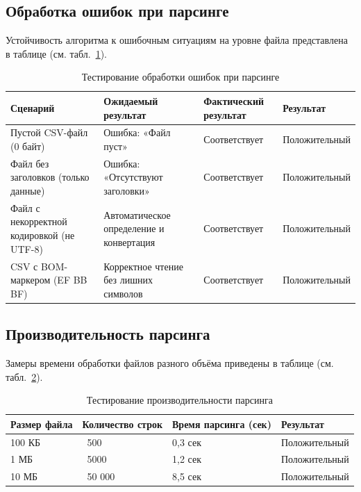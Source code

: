 \subsection{Обработка ошибок при парсинге}
Устойчивость алгоритма к ошибочным ситуациям на уровне файла представлена в таблице (см. табл.~\ref{tab:testParseError}).

\begin{table}[H]
\caption{\label{tab:testParseError}Тестирование обработки ошибок при парсинге}
\small
\begin{center}
\vspace{-0.5cm}\begin{tabular}{|p{4.5cm}|p{4.5cm}|p{3cm}|p{3cm}|}
\hline
Сценарий & Ожидаемый результат & Фактический результат & Результат \\ \hline
Пустой CSV-файл (0 байт) & Ошибка: «Файл пуст» & Соответствует & Положительный \\ \hline
Файл без заголовков (только данные) & Ошибка: «Отсутствуют заголовки» & Соответствует & Положительный \\ \hline
Файл с некорректной кодировкой (не UTF-8) & Автоматическое определение и конвертация & Соответствует & Положительный \\ \hline
CSV с BOM-маркером (EF BB BF) & Корректное чтение без лишних символов & Соответствует & Положительный \\ \hline
\end{tabular}
\end{center}
\end{table}

\subsection{Производительность парсинга}
Замеры времени обработки файлов разного объёма приведены в таблице (см. табл.~\ref{tab:testPerformance}).

\begin{table}[H]
\caption{\label{tab:testPerformance}Тестирование производительности парсинга}
\small
\begin{center}
\vspace{-0.5cm}\begin{tabular}{|p{3cm}|p{3cm}|p{4cm}|p{3cm}|}
\hline
Размер файла & Количество строк & Время парсинга (сек) & Результат \\ \hline
100 КБ & ~500 & 0,3 сек & Положительный \\ \hline
1 МБ & ~5000 & 1,2 сек & Положительный \\ \hline
10 МБ & ~50 000 & 8,5 сек & Положительный \\ \hline
\end{tabular}
\end{center}
\end{table}

